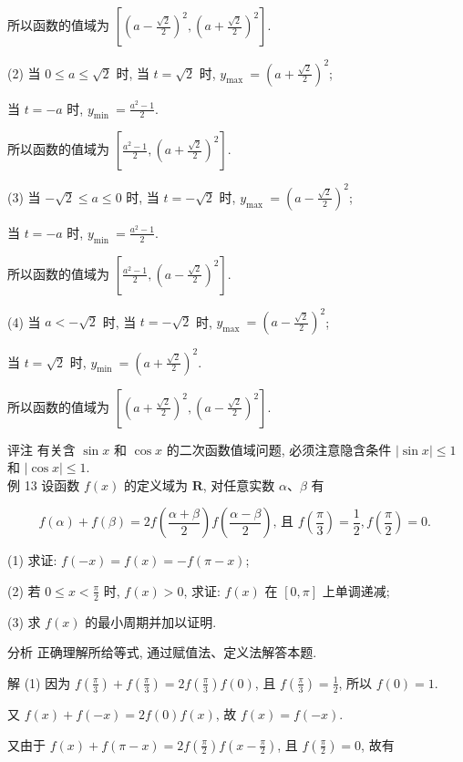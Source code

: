 	所以函数的值域为 $\left[\left(a-\frac{\sqrt{2}}{2}\right)^{2},\left(a+\frac{\sqrt{2}}{2}\right)^{2}\right]$.

	(2) 当 $0 \leqslant a \leqslant \sqrt{2}$ 时, 当 $t=\sqrt{2}$ 时, $y_{\text {max }}=\left(a+\frac{\sqrt{2}}{2}\right)^{2}$;

	当 $t=-a$ 时, $y_{\text {min }}=\frac{a^{2}-1}{2}$.

	所以函数的值域为 $\left[\frac{a^{2}-1}{2},\left(a+\frac{\sqrt{2}}{2}\right)^{2}\right]$.

	(3) 当 $-\sqrt{2} \leqslant a \leqslant 0$ 时, 当 $t=-\sqrt{2}$ 时, $y_{\text {max }}=\left(a-\frac{\sqrt{2}}{2}\right)^{2}$;

	当 $t=-a$ 时, $y_{\text {min }}=\frac{a^{2}-1}{2}$.

	所以函数的值域为 $\left[\frac{a^{2}-1}{2},\left(a-\frac{\sqrt{2}}{2}\right)^{2}\right]$.

	(4) 当 $a<-\sqrt{2}$ 时, 当 $t=-\sqrt{2}$ 时, $y_{\text {max }}=\left(a-\frac{\sqrt{2}}{2}\right)^{2}$;

	当 $t=\sqrt{2}$ 时, $y_{\text {min }}=\left(a+\frac{\sqrt{2}}{2}\right)^{2}$.

	所以函数的值域为 $\left[\left(a+\frac{\sqrt{2}}{2}\right)^{2},\left(a-\frac{\sqrt{2}}{2}\right)^{2}\right]$.

	评注 有关含 $\sin x$ 和 $\cos x$ 的二次函数值域问题, 必须注意隐含条件 $|\sin x| \leqslant 1$ 和 $|\cos x| \leqslant 1$.\\
	例 13 设函数 $f(x)$ 的定义域为 $\mathbf{R}$, 对任意实数 $\alpha 、 \beta$ 有

	$$
		f(\alpha)+f(\beta)=2 f\left(\frac{\alpha+\beta}{2}\right) f\left(\frac{\alpha-\beta}{2}\right) \text {, 且 } f\left(\frac{\pi}{3}\right)=\frac{1}{2}, f\left(\frac{\pi}{2}\right)=0 \text {. }
	$$

	(1) 求证: $f(-x)=f(x)=-f(\pi-x)$;

	(2) 若 $0 \leqslant x<\frac{\pi}{2}$ 时, $f(x)>0$, 求证: $f(x)$ 在 $[0, \pi]$ 上单调递减;

	(3) 求 $f(x)$ 的最小周期并加以证明.

	分析 正确理解所给等式, 通过赋值法、定义法解答本题.

	解 (1) 因为 $f\left(\frac{\pi}{3}\right)+f\left(\frac{\pi}{3}\right)=2 f\left(\frac{\pi}{3}\right) f(0)$, 且 $f\left(\frac{\pi}{3}\right)=\frac{1}{2}$, 所以 $f(0)=1$.

	又 $f(x)+f(-x)=2 f(0) f(x)$, 故 $f(x)=f(-x)$.

	又由于 $f(x)+f(\pi-x)=2 f\left(\frac{\pi}{2}\right) f\left(x-\frac{\pi}{2}\right)$, 且 $f\left(\frac{\pi}{2}\right)=0$, 故有

